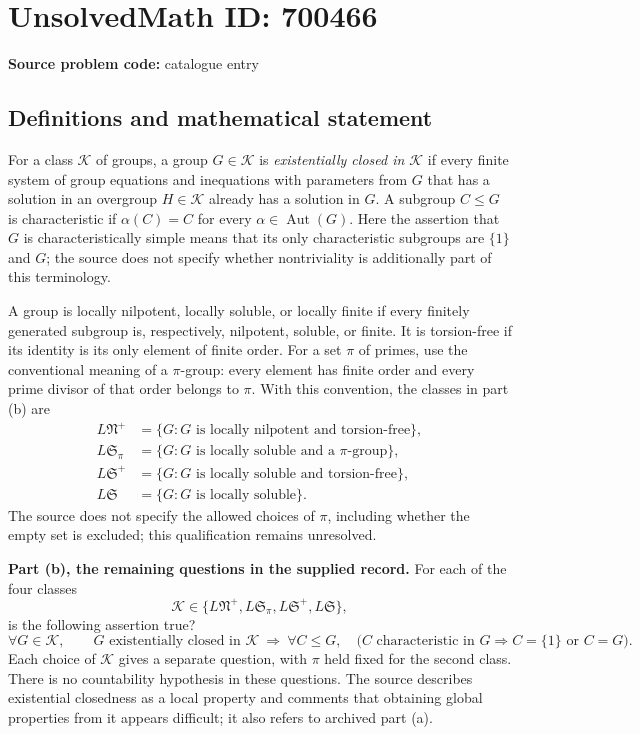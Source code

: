 \documentclass[11pt]{article}
\begin{document}
\section*{UnsolvedMath ID: 700466}
\textbf{Source problem code:} catalogue entry
\subsection{Definitions and mathematical statement}
For a class \(\mathcal K\) of groups, a group \(G\in\mathcal K\) is \emph{existentially closed in \(\mathcal K\)} if every finite system of group equations and inequations with parameters from \(G\) that has a solution in an overgroup \(H\in\mathcal K\) already has a solution in \(G\). A subgroup \(C\leq G\) is characteristic if \(\alpha(C)=C\) for every \(\alpha\in\operatorname{Aut}(G)\). Here the assertion that \(G\) is characteristically simple means that its only characteristic subgroups are \(\{1\}\) and \(G\); the source does not specify whether nontriviality is additionally part of this terminology.

A group is locally nilpotent, locally soluble, or locally finite if every finitely generated subgroup is, respectively, nilpotent, soluble, or finite. It is torsion-free if its identity is its only element of finite order. For a set \(\pi\) of primes, use the conventional meaning of a \(\pi\)-group: every element has finite order and every prime divisor of that order belongs to \(\pi\). With this convention, the classes in part (b) are
\[
\begin{aligned}
L\mathfrak N^{+}&=\{G:G\text{ is locally nilpotent and torsion-free}\},\\
L\mathfrak S_{\pi}&=\{G:G\text{ is locally soluble and a }\pi\text{-group}\},\\
L\mathfrak S^{+}&=\{G:G\text{ is locally soluble and torsion-free}\},\\
L\mathfrak S&=\{G:G\text{ is locally soluble}\}.
\end{aligned}
\]
The source does not specify the allowed choices of \(\pi\), including whether the empty set is excluded; this qualification remains unresolved.

\textbf{Part (b), the remaining questions in the supplied record.} For each of the four classes
\[
\mathcal K\in\{L\mathfrak N^{+},L\mathfrak S_{\pi},L\mathfrak S^{+},L\mathfrak S\},
\]
is the following assertion true?
\[
\forall G\in\mathcal K,\qquad
G\text{ existentially closed in }\mathcal K
\ \Longrightarrow\
\forall C\leq G,\quad
\bigl(C\text{ characteristic in }G\Longrightarrow C=\{1\}\text{ or }C=G\bigr).
\]
Each choice of \(\mathcal K\) gives a separate question, with \(\pi\) held fixed for the second class. There is no countability hypothesis in these questions. The source describes existential closedness as a local property and comments that obtaining global properties from it appears difficult; it also refers to archived part (a).
\end{document}
